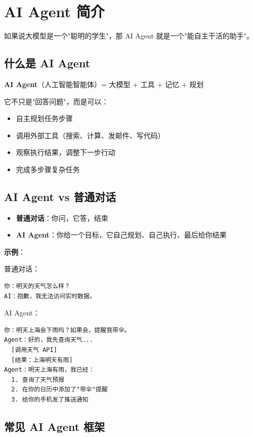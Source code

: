 \documentclass[12pt,UTF8]{ctexbook}
\begin{document}
\section{AI Agent 简介}

如果说大模型是一个"聪明的学生"，那 AI Agent 就是一个"能自主干活的助手"。

\subsection{什么是 AI Agent}

\textbf{AI Agent}（人工智能智能体）= 大模型 + 工具 + 记忆 + 规划

它不只是"回答问题"，而是可以：
\begin{itemize}
  \item 自主规划任务步骤
  \item 调用外部工具（搜索、计算、发邮件、写代码）
  \item 观察执行结果，调整下一步行动
  \item 完成多步骤复杂任务
\end{itemize}

\subsection{AI Agent vs 普通对话}

\begin{itemize}
  \item \textbf{普通对话}：你问，它答，结束
  \item \textbf{AI Agent}：你给一个目标，它自己规划、自己执行、最后给你结果
\end{itemize}

\textbf{示例}：

普通对话：
\begin{verbatim}
你：明天的天气怎么样？
AI：抱歉，我无法访问实时数据。
\end{verbatim}

AI Agent：
\begin{verbatim}
你：明天上海会下雨吗？如果会，提醒我带伞。
Agent：好的，我先查询天气...
  [调用天气 API]
  [结果：上海明天有雨]
Agent：明天上海有雨，我已经：
  1. 查询了天气预报
  2. 在你的日历中添加了"带伞"提醒
  3. 给你的手机发了推送通知
\end{verbatim}

\subsection{常见 AI Agent 框架}
\end{document}
